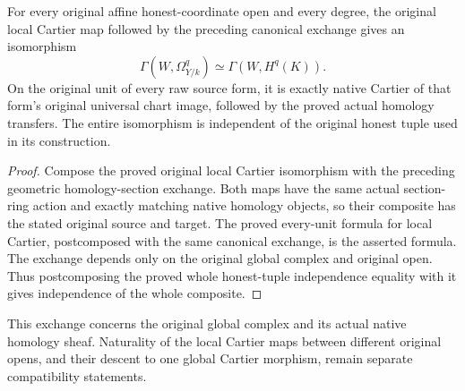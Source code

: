 \begin{theorem}
\label{thm:cartier-geometric-local-global-homology-sections}
\leanok
{}
For every original affine honest-coordinate open and every degree,
the original local Cartier map followed by the preceding canonical
exchange gives an isomorphism
\[
 \Gamma(W,\Omega^q_{Y/k})\simeq\Gamma(W,H^q(K)).
\]
On the original unit of every raw source form, it is exactly native
Cartier of that form's original universal chart image, followed by
the proved actual homology transfers. The entire isomorphism is
independent of the original honest tuple used in its construction.
\end{theorem}
\begin{proof}
Compose the proved original local Cartier isomorphism with the
preceding geometric homology-section exchange. Both maps have the
same actual section-ring action and exactly matching native homology
objects, so their composite has the stated original source and target.
The proved every-unit formula for local Cartier, postcomposed with
the same canonical exchange, is the asserted formula. The exchange
depends only on the original global complex and original open. Thus
postcomposing the proved whole honest-tuple independence equality
with it gives independence of the whole composite.
\end{proof}

This exchange concerns the original global complex and its actual
native homology sheaf. Naturality of the local Cartier maps between
different original opens, and their descent to one global Cartier
morphism, remain separate compatibility statements.
